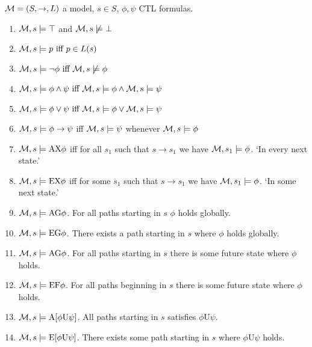 \documentclass[10pt,a4paper]{article}
\begin{document}
$\mathcal{M} = (S, \to, L)$ a model, $s \in S$, $\phi, \psi$ CTL formulas.

\begin{enumerate}
  \item $\mathcal{M}, s \models \top$ and $\mathcal{M}, s \not\models \bot$
  \item $\mathcal{M}, s \models p \text{ iff } p \in L(s)$
  \item $\mathcal{M}, s \models \neg \phi \text{ iff } \mathcal{M}, s \not\models \phi$
  \item $\mathcal{M}, s \models \phi \land \psi \text{ iff } \mathcal{M}, s \models \phi \land \mathcal{M}, s \models \psi$
  \item $\mathcal{M}, s \models \phi \lor \psi \text{ iff } \mathcal{M}, s \models \phi \lor \mathcal{M}, s \models \psi$
  \item $\mathcal{M}, s \models \phi \to \psi$ iff $\mathcal{M}, s \models \psi$ whenever $\mathcal{M}, s \models \phi$
  \item $\mathcal{M}, s \models \text{AX} \phi$ iff for all $s_1$ such that $s \to s_1$ we have $\mathcal{M}, s_1 \models \phi$. `In every next state.'
  \item $\mathcal{M}, s \models \text{EX} \phi$ iff for some $s_1$ such that $s \to s_1$ we have $\mathcal{M}, s_1 \models \phi$. `In some next state.'
  \item $\mathcal{M}, s \models \text{AG} \phi$. For all paths starting in $s$ $\phi$ holds globally.
  \item $\mathcal{M}, s \models \text{EG} \phi$. There exists a path starting in $s$ where $\phi$ holds globally.
  \item $\mathcal{M}, s \models \text{AG} \phi$. For all paths starting in $s$ there is some future state where $\phi$ holds.
  \item $\mathcal{M}, s \models \text{EF} \phi$. For all paths beginning in $s$ there is some future state where $\phi$ holds.
  \item $\mathcal{M}, s \models \text{A}[\phi \text{U} \psi]$. All paths starting in $s$ satisfies $\phi \text{U} \psi$.
  \item $\mathcal{M}, s \models \text{E}[\phi \text{U} \psi]$. There exists some path starting in $s$ where $\phi \text{U} \psi$ holds.
\end{enumerate}
\end{document}
